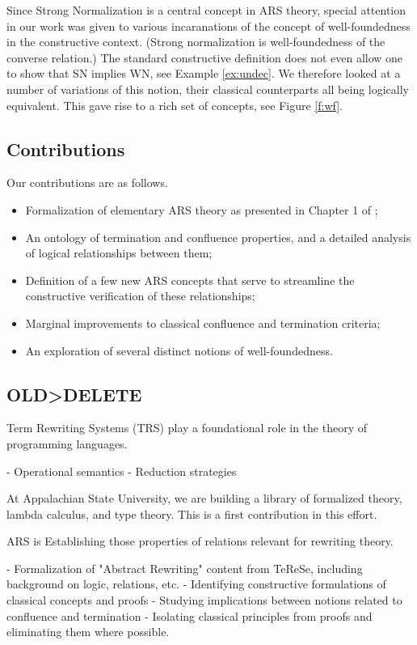 Since Strong Normalization is a central concept in ARS theory,
special attention in our work was given to various incaranations of the concept of well-foundedness in the constructive context.
(Strong normalization is well-foundedness of the converse relation.)
The standard constructive definition does not even allow one to show that SN implies WN, see Example \ref{ex:undec}.  We therefore looked at a number of variations of this notion, their classical counterparts all being logically equivalent.  This gave rise to a rich set of concepts, see Figure \ref{f:wf}.

\subsection{Contributions}
Our contributions are as follows.
\begin{itemize}
  \item Formalization of elementary ARS theory as presented in
  Chapter 1 of \cite{Terese};
  \item An ontology of termination and confluence properties, and a detailed analysis of logical relationships between them;
  \item Definition of a few new ARS concepts that serve to streamline the constructive verification of these relationships;
  \item Marginal improvements to classical confluence and termination criteria;
  \item An exploration of several distinct notions of well-foundedness.
\end{itemize}

\subsection{OLD>DELETE}
{ \color{gray}
Term Rewriting Systems (TRS) play a foundational role in the theory of
programming languages.

- Operational semantics
- Reduction strategies

At Appalachian State University, we are building a library of formalized theory,
lambda calculus, and type theory. This is a first contribution in this effort.

ARS is Establishing those properties of relations relevant for rewriting theory.

- Formalization of "Abstract Rewriting" content from TeReSe,
including background on logic, relations, etc.
- Identifying constructive formulations of classical concepts and proofs
- Studying implications between notions related to confluence and termination
- Isolating classical principles from proofs and eliminating them where possible.
}
